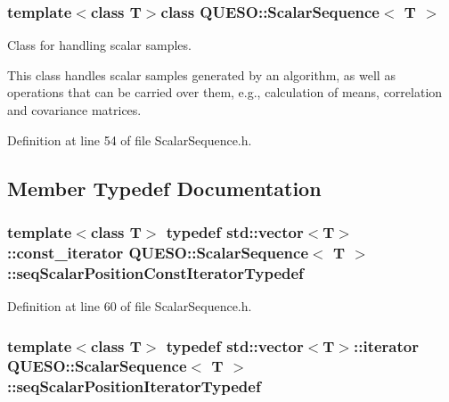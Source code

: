 \subsubsection*{template$<$class T$>$class Q\-U\-E\-S\-O\-::\-Scalar\-Sequence$<$ T $>$}

Class for handling scalar samples. 

This class handles scalar samples generated by an algorithm, as well as operations that can be carried over them, e.\-g., calculation of means, correlation and covariance matrices. 

Definition at line 54 of file Scalar\-Sequence.\-h.



\subsection{Member Typedef Documentation}
\hypertarget{class_q_u_e_s_o_1_1_scalar_sequence_a1a43b88ee86997e3cc9c4f686ac3a359}{
\subsubsection[{seq\-Scalar\-Position\-Const\-Iterator\-Typedef}]{\setlength{\rightskip}{0pt plus 5cm}template$<$class T$>$ typedef std\-::vector$<$T$>$\-::const\-\_\-iterator {\bf Q\-U\-E\-S\-O\-::\-Scalar\-Sequence}$<$ T $>$\-::{\bf seq\-Scalar\-Position\-Const\-Iterator\-Typedef}}}\label{class_q_u_e_s_o_1_1_scalar_sequence_a1a43b88ee86997e3cc9c4f686ac3a359}


Definition at line 60 of file Scalar\-Sequence.\-h.

\hypertarget{class_q_u_e_s_o_1_1_scalar_sequence_a8366353bde8e82708560867520596d64}{
\subsubsection[{seq\-Scalar\-Position\-Iterator\-Typedef}]{\setlength{\rightskip}{0pt plus 5cm}template$<$class T$>$ typedef std\-::vector$<$T$>$\-::iterator {\bf Q\-U\-E\-S\-O\-::\-Scalar\-Sequence}$<$ T $>$\-::{\bf seq\-Scalar\-Position\-Iterator\-Typedef}}}\label{class_q_u_e_s_o_1_1_scalar_sequence_a8366353bde8e82708560867520596d64}


